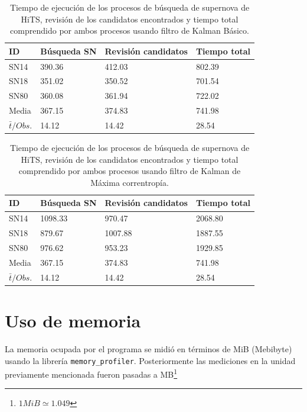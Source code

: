 \begin{table}[h]
\centering
\begin{tabular}{|l|l|l|l|}
\hline
\textbf{ID} & \textbf{B\'usqueda SN} & \textbf{Revisi\'on candidatos} & \textbf{Tiempo total} \\ \hline
\hline
SN14 & 390.36 & 412.03 & 802.39 \\\hline
SN18 & 351.02 & 350.52 & 701.54\\\hline
SN80 & 360.08 & 361.94 & 722.02 \\\hline\hline
Media & 367.15 & 374.83 & 741.98  \\\hline
 $\bar{t}/Obs. $& 14.12 & 14.42 & 28.54\\\hline 
\end{tabular}
\label{tab:t5}
\caption{Tiempo de ejecuci\'on de los procesos de b\'usqueda de supernova de HiTS, revisi\'on de los candidatos encontrados y tiempo total comprendido por ambos procesos usando filtro de Kalman B\'asico.}
\end{table}


\begin{table}[h]
\centering
\begin{tabular}{|l|l|l|l|}
\hline
\textbf{ID} & \textbf{B\'usqueda SN} & \textbf{Revisi\'on candidatos} & \textbf{Tiempo total} \\ \hline
\hline
SN14 & 1098.33 & 970.47 & 2068.80\\\hline
SN18 & 879.67 & 1007.88 & 1887.55\\\hline
SN80 & 976.62& 953.23& 1929.85\\\hline \hline
Media & 367.15 & 374.83 & 741.98  \\\hline
 $\bar{t}/Obs. $& 14.12 & 14.42 & 28.54\\\hline 
\end{tabular}
\label{tab:t6}
\caption{Tiempo de ejecuci\'on de los procesos de b\'usqueda de supernova de HiTS, revisi\'on de los candidatos encontrados y tiempo total comprendido por ambos procesos usando filtro de Kalman de M\'axima correntrop\'ia.}
\end{table}

\section{Uso de memoria}

La memoria ocupada por el programa se midi\'o en t\'erminos de MiB (Mebibyte) usando la librer\'ia \texttt{memory\_profiler}. Posteriormente las mediciones en la unidad previamente mencionada fueron pasadas a MB\footnote{$1MiB\simeq 1.049$ }

